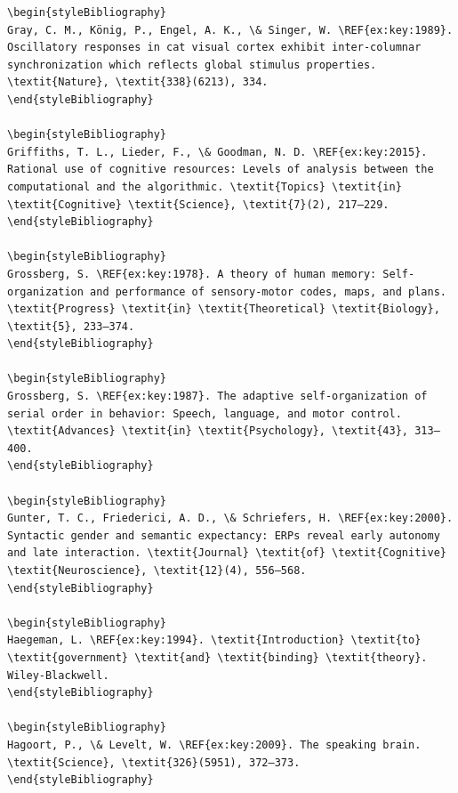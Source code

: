 \begin{verbatim}
\begin{styleBibliography}
Gray, C. M., König, P., Engel, A. K., \& Singer, W. \REF{ex:key:1989}. Oscillatory responses in cat visual cortex exhibit inter-columnar synchronization which reflects global stimulus properties. \textit{Nature}, \textit{338}(6213), 334.
\end{styleBibliography}

\begin{styleBibliography}
Griffiths, T. L., Lieder, F., \& Goodman, N. D. \REF{ex:key:2015}. Rational use of cognitive resources: Levels of analysis between the computational and the algorithmic. \textit{Topics} \textit{in} \textit{Cognitive} \textit{Science}, \textit{7}(2), 217–229.
\end{styleBibliography}

\begin{styleBibliography}
Grossberg, S. \REF{ex:key:1978}. A theory of human memory: Self-organization and performance of sensory-motor codes, maps, and plans. \textit{Progress} \textit{in} \textit{Theoretical} \textit{Biology}, \textit{5}, 233–374.
\end{styleBibliography}

\begin{styleBibliography}
Grossberg, S. \REF{ex:key:1987}. The adaptive self-organization of serial order in behavior: Speech, language, and motor control. \textit{Advances} \textit{in} \textit{Psychology}, \textit{43}, 313–400.
\end{styleBibliography}

\begin{styleBibliography}
Gunter, T. C., Friederici, A. D., \& Schriefers, H. \REF{ex:key:2000}. Syntactic gender and semantic expectancy: ERPs reveal early autonomy and late interaction. \textit{Journal} \textit{of} \textit{Cognitive} \textit{Neuroscience}, \textit{12}(4), 556–568.
\end{styleBibliography}

\begin{styleBibliography}
Haegeman, L. \REF{ex:key:1994}. \textit{Introduction} \textit{to} \textit{government} \textit{and} \textit{binding} \textit{theory}. Wiley-Blackwell.
\end{styleBibliography}

\begin{styleBibliography}
Hagoort, P., \& Levelt, W. \REF{ex:key:2009}. The speaking brain. \textit{Science}, \textit{326}(5951), 372–373.
\end{styleBibliography}


\end{verbatim}
